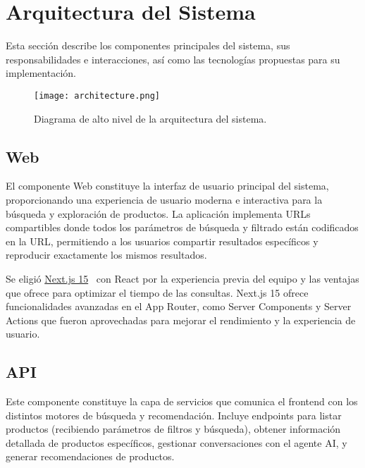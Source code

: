 \graphicspath{{./figures/arquitectura/}}

\section{Arquitectura del Sistema}

Esta sección describe los componentes principales del sistema, sus responsabilidades e interacciones, así como las tecnologías propuestas para su implementación.

\vspace{1cm}

\begin{figure}[H]
    \centering
    \texttt{[image: architecture.png]}
    \caption{Diagrama de alto nivel de la arquitectura del sistema.}
    \label{fig:system_architecture}
\end{figure}

\subsection{Web}

El componente Web constituye la interfaz de usuario principal del sistema, proporcionando una experiencia de usuario moderna e interactiva para la búsqueda y exploración de productos. La aplicación implementa URLs compartibles donde todos los parámetros de búsqueda y filtrado están codificados en la URL, permitiendo a los usuarios compartir resultados específicos y reproducir exactamente los mismos resultados.

Se eligió \href{https://nextjs.org/}{Next.js 15}~\cite{NextJS} con React por la experiencia previa del equipo y las ventajas que ofrece para optimizar el tiempo de las consultas. Next.js 15 ofrece funcionalidades avanzadas en el App Router, como Server Components y Server Actions que fueron aprovechadas para mejorar el rendimiento y la experiencia de usuario.

\subsection{API}

Este componente constituye la capa de servicios que comunica el frontend con los distintos motores de búsqueda y recomendación. Incluye endpoints para listar productos (recibiendo parámetros de filtros y búsqueda), obtener información detallada de productos específicos, gestionar conversaciones con el agente AI, y generar recomendaciones de productos.

